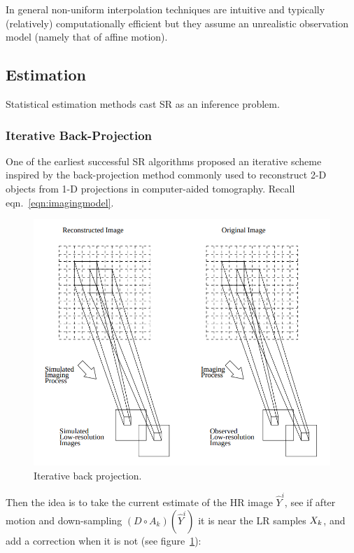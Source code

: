 In general non-uniform interpolation techniques are intuitive and typically (relatively) computationally efficient but they assume an unrealistic observation model (namely that of affine motion).

\subsection{Estimation}\label{subsec:estimation}

Statistical estimation methods cast SR as an inference problem.
%
\subsubsection{Iterative Back-Projection}
One of the earliest successful SR algorithms\cite{Irani1991ImprovingRB} proposed an iterative scheme inspired by the back-projection method commonly used to reconstruct 2-D objects from 1-D projections in computer-aided tomography.
%
Recall eqn.~\eqref{eqn:imagingmodel}.
\begin{figure}
	\centering
	\includegraphics[width=\linewidth,keepaspectratio]{figures/classical/iterative_back_projection.png}
	\caption{Iterative back projection\cite{Irani1991ImprovingRB}.}
	\label{fig:iterbackproj}
\end{figure}
%
Then the idea is to take the current estimate of the HR image \(\hat{Y}^{i}\), see if after motion and down-sampling \((D \circ A_k)(\hat{Y}^i)\) it is near the LR samples \(X_k\), and add a correction when it is not (see figure~\ref{fig:iterbackproj}):
